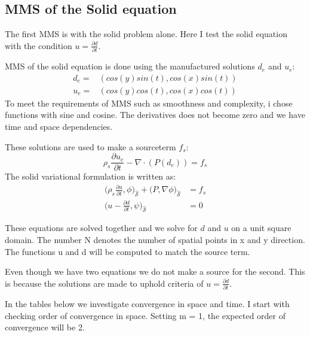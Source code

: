 \subsection{MMS of the Solid equation }
The first MMS is with the solid problem alone. Here I test the solid equation with the condition $u = \frac{\partial d}{\partial t}$.\newline

MMS of the solid equation is done using the manufactured solutions $d_e$ and $u_e$: 
\begin{align*}
d_e =& ( cos(y)sin(t) , cos(x)sin(t) )\\
u_e =& ( cos(y)cos(t), cos(x)cos(t) )
\end{align*}
To meet the requirements of MMS such as smoothness and complexity, i chose functions with sine and cosine. The derivatives does not become zero and we have time and space dependencies. 
\newline

These solutions are used to make a sourceterm $f_s$:
$$\rho_s \frac{\partial u_e}{\partial t} - \nabla \cdot ( P(d_e) ) = f_s $$
The solid variational formulation is written as:
\begin{align}
\big(\rho_s \frac{\partial u}{\partial t},\phi \big)_{\mathcal{\hat{S}}} + \big(P, \nabla \phi \big)_{\mathcal{\hat{S}}} &=f_s \\
\big( u- \frac{\partial d}{\partial t} ,\psi \big)_{\mathcal{\hat{S}}} &= 0 
\end{align}

These equations are solved together and we solve for $d$ and $u$ on a unit square domain. The number N denotes the number of spatial points in x and y direction. The functions u and d will be computed to match the source term. 

Even though we have two equations we do not make a source for the second. This is because the solutions are made to uphold criteria of $u = \frac{\partial d}{\partial t}$.\newline

In the tables below we investigate convergence in space and time.
I start with checking order of convergence in space. Setting m = 1, the expected order of convergence will be 2. 

